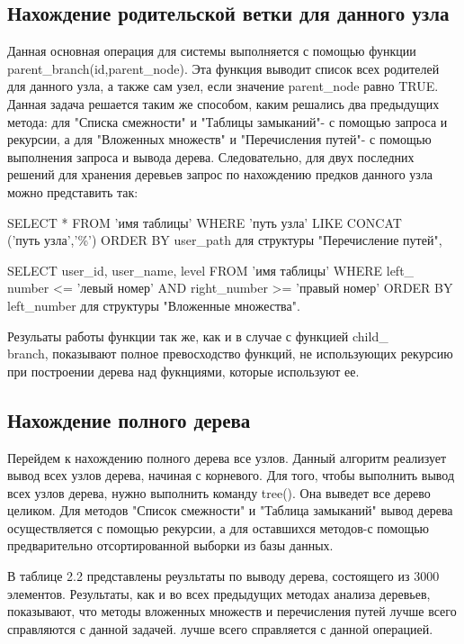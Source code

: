 \documentclass[a4paper,14pt]{extreport}
\theoremstyle{definition}
\begin{document}
\subsection{Нахождение родительской ветки для данного узла}
Данная основная операция для системы выполняется с помощью функции parent\_branch(\textdollar id,\textdollar parent\_node). Эта функция выводит список всех родителей для данного узла, а также сам узел, если значение \textdollar parent\_node равно TRUE.
Данная задача решается таким же способом, каким решались два предыдущих метода: для "Списка смежности" и "Таблицы замыканий"- с помощью запроса и рекурсии, а для "Вложенных множеств" и "Перечисления путей"- с помощью выполнения запроса и вывода дерева. Следовательно, для двух последних решений для хранения деревьев запрос по нахождению предков данного узла можно представить так:

SELECT * FROM 'имя таблицы' WHERE 'путь узла' LIKE CONCAT\\('путь узла','\%') ORDER BY user\_path для структуры "Перечисление путей",

SELECT user\_id, user\_name, level FROM 'имя таблицы' WHERE left\_\\number <= 'левый номер' AND right\_number >= 'правый номер'  ORDER BY left\_number для структуры "Вложенные множества".

Резульаты работы функции так же, как и в случае с функцией child\_\\branch, показывают полное превосходство функций, не использующих рекурсию при построении дерева над фукнциями, которые используют ее.

\subsection{Нахождение полного дерева}
Перейдем к нахождению полного дерева все узлов. Данный алгоритм реализует вывод всех узлов дерева, начиная с корневого. Для того, чтобы выполнить вывод всех узлов дерева, нужно выполнить команду tree(). Она выведет все дерево целиком. Для методов "Список смежности" и "Таблица замыканий" вывод дерева осуществляется с помощью рекурсии, а для оставшихся методов-с помощью предварительно отсортированной выборки из базы данных.

В таблице 2.2 представлены реузльтаты по выводу дерева, состоящего из 3000 элементов. Результаты, как и во всех предыдущих методах анализа деревьев, показывают, что методы вложенных множеств и перечисления путей лучше всего справляются с данной задачей. лучше всего справляется с данной операцией.
\end{document}
